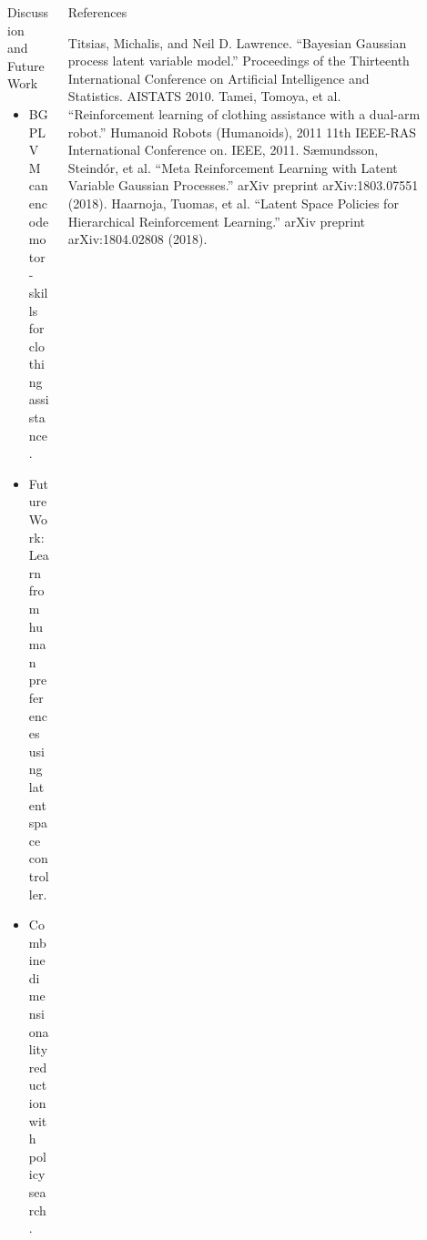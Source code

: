 \documentclass[final,hyperref={pdfpagelabels=false}]{beamer}
\begin{document}
\begin{frame}[t]
    \begin{columns}[t]
        \begin{column}{.02\textwidth}\end{column}

        \begin{column}{0.47\textwidth}
            \begin{block}{Discussion and Future Work}
                \begin{itemize}
                    \item BGPLVM can encode motor-skills for clothing assistance. \vspace*{1cm}
                    \item Future Work: Learn from human preferences using latent space controller. \vspace*{1cm}
                    \item Combine dimensionality reduction with policy search.
                \end{itemize}
            \end{block}
        \end{column}

        \begin{column}{0.47\textwidth}
            \begin{block}{References}
                \nocite{*}
                \scriptsize{
                    
                    \begin{thebibliography}{10}
                        Titsias, Michalis, and Neil D. Lawrence. ``Bayesian Gaussian process latent variable model.'' Proceedings of the Thirteenth International Conference on Artificial Intelligence and Statistics. AISTATS 2010.
                        Tamei, Tomoya, et al. ``Reinforcement learning of clothing assistance with a dual-arm robot.'' Humanoid Robots (Humanoids), 2011 11th IEEE-RAS International Conference on. IEEE, 2011.
                        Sæmundsson, Steindór, et al. ``Meta Reinforcement Learning with Latent Variable Gaussian Processes.'' arXiv preprint arXiv:1803.07551 (2018).
                        Haarnoja, Tuomas, et al. ``Latent Space Policies for Hierarchical Reinforcement Learning.'' arXiv preprint arXiv:1804.02808 (2018).
                    \end{thebibliography}}
            \end{block}
        \end{column}

        \begin{column}{.02\textwidth}\end{column}
    \end{columns}

\end{frame}
\end{document}
